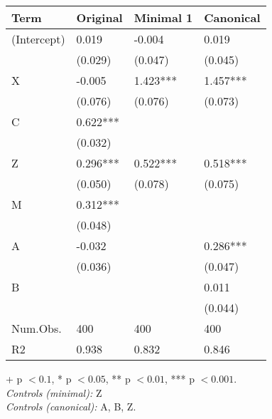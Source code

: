 \begin{longtable}{@{}p{\dimexpr(\textwidth - 6\tabcolsep)/4\relax}p{\dimexpr(\textwidth - 6\tabcolsep)/4\relax}p{\dimexpr(\textwidth - 6\tabcolsep)/4\relax}p{\dimexpr(\textwidth - 6\tabcolsep)/4\relax}@{}}
\toprule
Term & Original & Minimal 1 & Canonical \\
\midrule
\textnormal{(Intercept)} & 0.019 & -0.004 & 0.019 \\
\textnormal{} & (0.029) & (0.047) & (0.045) \\
\textnormal{X} & -0.005 & 1.423*** & 1.457*** \\
\textnormal{} & (0.076) & (0.076) & (0.073) \\
\textnormal{C} & 0.622*** &  &  \\
\textnormal{} & (0.032) &  &  \\
\textnormal{Z} & 0.296*** & 0.522*** & 0.518*** \\
\textnormal{} & (0.050) & (0.078) & (0.075) \\
\textnormal{M} & 0.312*** &  &  \\
\textnormal{} & (0.048) &  &  \\
\textnormal{A} & -0.032 &  & 0.286*** \\
\textnormal{} & (0.036) &  & (0.047) \\
\textnormal{B} &  &  & 0.011 \\
\textnormal{} &  &  & (0.044) \\
\midrule[\heavyrulewidth]
\textnormal{Num.Obs.} & 400 & 400 & 400 \\
\textnormal{R2} & 0.938 & 0.832 & 0.846 \\
\bottomrule
\end{longtable}
\endgroup
\par\endgroup
{\footnotesize + p $< 0.1$, * p $< 0.05$, ** p $< 0.01$, *** p $< 0.001$.\\
\hspace*{1.5em}\textit{Controls (minimal):} {Z}\\
\hspace*{1.5em}\textit{Controls (canonical):} {A, B, Z}.}
\endgroup
